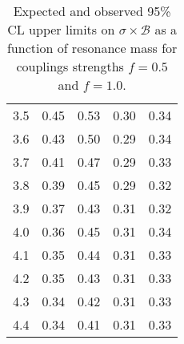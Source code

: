 \begin{table}[h!]
\begin{center}
\begin{tabular}{c||cc||cc}
3.5 & 0.45  &  0.53 & 0.30 &  0.34 \\
3.6 & 0.43  &  0.50 & 0.29 &  0.34 \\
3.7 & 0.41  &  0.47 & 0.29 &  0.33 \\
3.8 & 0.39  &  0.45 & 0.29 &  0.32 \\
3.9 & 0.37  &  0.43 & 0.31 &  0.32 \\
4.0 & 0.36  &  0.45 & 0.31 &  0.34 \\
4.1 & 0.35  &  0.44 & 0.31 &  0.33 \\
4.2 & 0.35  &  0.43 & 0.31 &  0.33 \\
4.3 & 0.34  &  0.42 & 0.31 &  0.33 \\
4.4 & 0.34  &  0.41 & 0.31 &  0.33 \\
\hline
\end{tabular}
\caption{Expected and observed 95\% CL upper limits on $\sigma\times\mathcal{B}$ as a function of resonance mass for couplings strengths $f=0.5$ and $f=1.0$.}
   \label{Table:ObsLimits}
\end{center}
\end{table}
